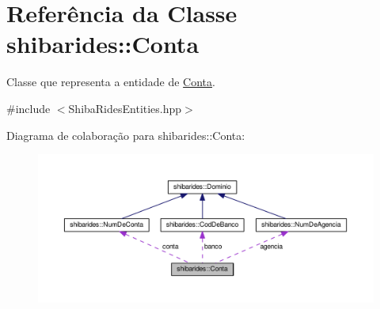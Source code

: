 \hypertarget{classshibarides_1_1Conta}{}\section{Referência da Classe shibarides\+:\+:Conta}
\label{classshibarides_1_1Conta}


Classe que representa a entidade de \hyperlink{classshibarides_1_1Conta}{Conta}.  




{\ttfamily \#include $<$Shiba\+Rides\+Entities.\+hpp$>$}



Diagrama de colaboração para shibarides\+:\+:Conta\+:\nopagebreak
\begin{figure}[H]
\begin{center}
\leavevmode
\includegraphics[width=350pt]{classshibarides_1_1Conta__coll__graph}
\end{center}
\end{figure}
